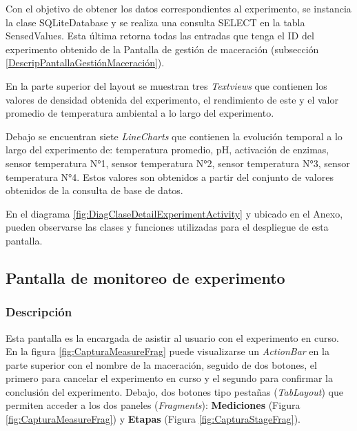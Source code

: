             \par Con el objetivo de obtener los datos correspondientes al experimento, se instancia la clase SQLiteDatabase y se realiza una consulta SELECT en la tabla SensedValues. Esta última retorna todas las entradas que tenga el ID del experimento obtenido de la Pantalla de gestión de maceración (subsección \ref{DescripPantallaGestiónMaceración}).
            
            \par En la parte superior del layout se muestran tres \textit{Textviews} que contienen los valores de densidad obtenida del experimento, el rendimiento de este y el valor promedio de temperatura ambiental a lo largo del experimento. 
            
            \par Debajo se encuentran siete \textit{LineCharts} que contienen la evolución temporal a lo largo del experimento de: temperatura promedio, pH, activación de enzimas, sensor temperatura N°1, sensor temperatura N°2, sensor temperatura N°3, sensor temperatura N°4. Estos valores son obtenidos a partir del conjunto de valores obtenidos de la consulta de base de datos.
            
            \par En el diagrama \ref{fig:DiagClaseDetailExperimentActivity} y ubicado en el Anexo, pueden observarse las clases y funciones utilizadas para el despliegue de esta pantalla.
        
        \subsection{Pantalla de monitoreo de experimento}
        \label{DescripPantallaMonitoreoExperimento}
            \subsubsection{Descripción}
            Esta pantalla es la encargada de asistir al usuario con el experimento en curso.
            En la figura \ref{fig:CapturaMeasureFrag} puede visualizarse un \textit{ActionBar} en la parte superior con el nombre de la maceración, seguido de dos botones, el primero para cancelar el experimento en curso y el segundo para confirmar la conclusión del experimento. Debajo, dos botones tipo pestañas (\textit{TabLayout}) que permiten acceder a los dos paneles (\textit{Fragments}): \textbf{Mediciones} (Figura \ref{fig:CapturaMeasureFrag}) y \textbf{Etapas} (Figura \ref{fig:CapturaStageFrag}).
            
